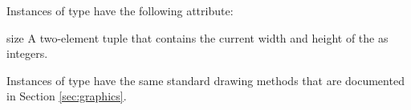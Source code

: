 Instances of  type have the following attribute:

\begin{memberdesc}[Canvas]{size}
A two-element tuple that contains the current width and height of the 
 as integers.
\end{memberdesc}

Instances of  type have the same standard drawing methods 
that are documented in Section \ref{sec:graphics}.
